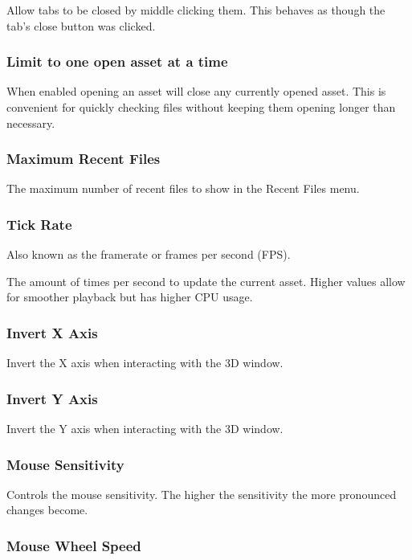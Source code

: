 \documentclass[10pt, a4paper, titlepage, oneside]{article}
\begin{document}
Allow tabs to be closed by middle clicking them. This behaves as though the tab's close button was clicked.

\subsubsection{Limit to one open asset at a time}

When enabled opening an asset will close any currently opened asset. This is convenient for quickly checking files without keeping them opening longer than necessary.

\subsubsection{Maximum Recent Files}

The maximum number of recent files to show in the Recent Files menu.

\subsubsection{Tick Rate}

Also known as the framerate or frames per second (FPS).

The amount of times per second to update the current asset. Higher values allow for smoother playback but has higher CPU usage.

\newpage

\subsubsection{Invert X Axis}

Invert the X axis when interacting with the 3D window.

\subsubsection{Invert Y Axis}

Invert the Y axis when interacting with the 3D window.

\subsubsection{Mouse Sensitivity}

Controls the mouse sensitivity. The higher the sensitivity the more pronounced changes become.

\subsubsection{Mouse Wheel Speed}
\end{document}
